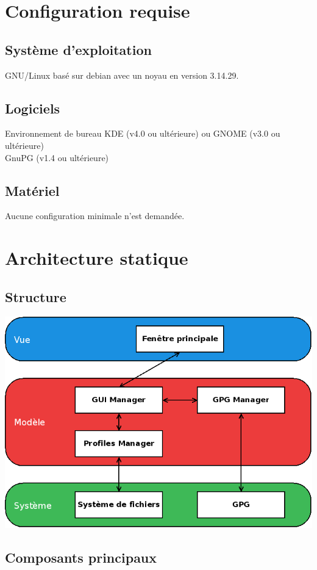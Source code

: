 \documentclass{../res/univ-projet}
\begin{document}
\section{Configuration requise}
  \subsection{Système d'exploitation}
    GNU/Linux basé sur debian avec un noyau en version 3.14.29.
  \subsection{Logiciels}
    Environnement de bureau KDE (v4.0 ou ultérieure) ou GNOME (v3.0 ou ultérieure)\\
    GnuPG (v1.4 ou ultérieure)
  \subsection{Matériel}
    Aucune configuration minimale n'est demandée.

\section{Architecture statique}
  \subsection{Structure} %
    \includegraphics[scale=0.5]{graphics/diagramme_archi.png}
  \newpage

  \subsection{Composants principaux}
    
\end{document}
